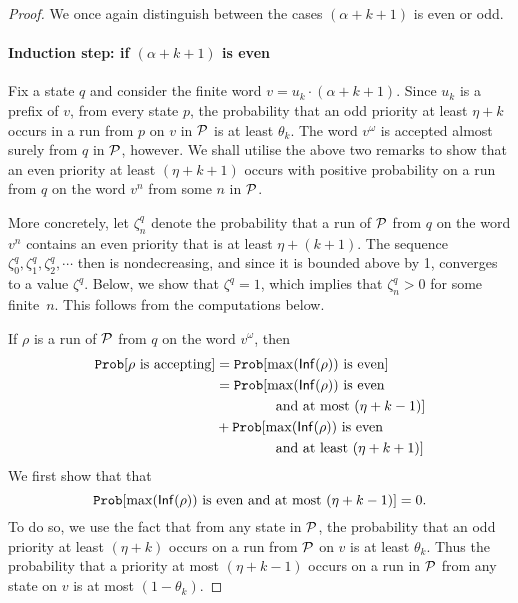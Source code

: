 \begin{proof}
    We once again distinguish between the cases $(\alpha+k+1)$ is even or odd.
    
    \paragraph*{Induction step: if $(\alpha+k+1)$ is even} 
    
    Fix a state $q$ and consider the finite word $v=u_k \cdot (\alpha+k+1)$. Since $u_k$ is a prefix of $v$, from every state $p$, the probability that an odd priority at least $\eta+k$ occurs in a run from $p$ on $v$ in $\mathcal{P}$ is at least $\theta_k$. The word $v^{\omega}$ is accepted almost surely from $q$ in $\mathcal{P}$, however. We shall utilise the above two remarks to show that an even priority at least $(\eta+k+1)$ occurs with positive probability on a run from $q$ on the word $v^n$ from some $n$ in $\mathcal{P}$.
    
    More concretely, let $\zeta^q_n$ denote the probability that a run of $\mathcal{P}$ from $q$ on the word $v^n$ contains an even priority that is at least $\eta+(k+1)$. The sequence $\zeta^q_0,\zeta^q_1,\zeta^q_2,\cdots$ then is nondecreasing, and since it is bounded above by 1, converges to a value $\zeta^q$. Below, we show that $\zeta^q=1$, which implies that $\zeta^q_n>0$ for some finite~$n$. This follows from the computations below.

    If $\rho$ is a run of $\mathcal{P}$ from $q$ on the word  $v^{\omega}$, then 
    \begin{equation*}
    \begin{split}
        \mathtt{Prob}[\rho \text{ is accepting}]
        &= \mathtt{Prob}[\max({\mathsf{Inf}}(\rho)) \text{ is even}] \\
        &= \mathtt{Prob}[\max({\mathsf{Inf}}(\rho)) \text{ is even} \\ 
        &\quad\quad\qquad\text{ and at most $(\eta+k-1)$}] \\
        &+ \mathtt{Prob}[\max({\mathsf{Inf}}(\rho)) \text{ is even} \\
        &\quad\quad\qquad\text{ and at least $(\eta+k+1)$}] \\
    \end{split} 
    \end{equation*}
    We first show that that $$\mathtt{Prob}[\max({\mathsf{Inf}}(\rho)) \text{ is even and at most $(\eta+k-1)$}]=0.$$ To do so, we use the fact that from any state in $\mathcal{P}$, the probability that an odd priority at least $(\eta+k)$ occurs on a run from $\mathcal{P}$ on $v$ is at least $\theta_k$. Thus the probability that a priority at most $(\eta+k-1)$ occurs on a run in $\mathcal{P}$ from any state on $v$ is at most $(1-\theta_k)$. 


\end{proof}
